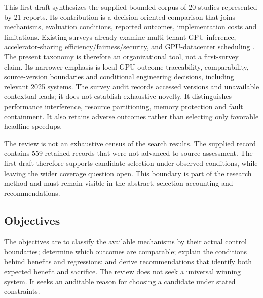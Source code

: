 This first draft synthesizes the supplied bounded corpus of 20 studies represented by 21 reports. Its contribution is a decision-oriented comparison that joins mechanisms, evaluation conditions, reported outcomes, implementation costs and limitations. Existing surveys already examine multi-tenant GPU inference, accelerator-sharing efficiency/fairness/security, and GPU-datacenter scheduling \cite{surveyYu,surveyHuang,surveyYe}. The present taxonomy is therefore an organizational tool, not a first-survey claim. Its narrower emphasis is local GPU outcome traceability, comparability, source-version boundaries and conditional engineering decisions, including relevant 2025 systems. The survey audit records accessed versions and unavailable contextual leads; it does not establish exhaustive novelty. It distinguishes performance interference, resource partitioning, memory protection and fault containment. It also retains adverse outcomes rather than selecting only favorable headline speedups.

The review is not an exhaustive census of the search results. The supplied record contains 559 retained records that were not advanced to source assessment. The first draft therefore supports candidate selection under observed conditions, while leaving the wider coverage question open. This boundary is part of the research method and must remain visible in the abstract, selection accounting and recommendations.

\subsection{Objectives}
The objectives are to classify the available mechanisms by their actual control boundaries; determine which outcomes are comparable; explain the conditions behind benefits and regressions; and derive recommendations that identify both expected benefit and sacrifice. The review does not seek a universal winning system. It seeks an auditable reason for choosing a candidate under stated constraints.

